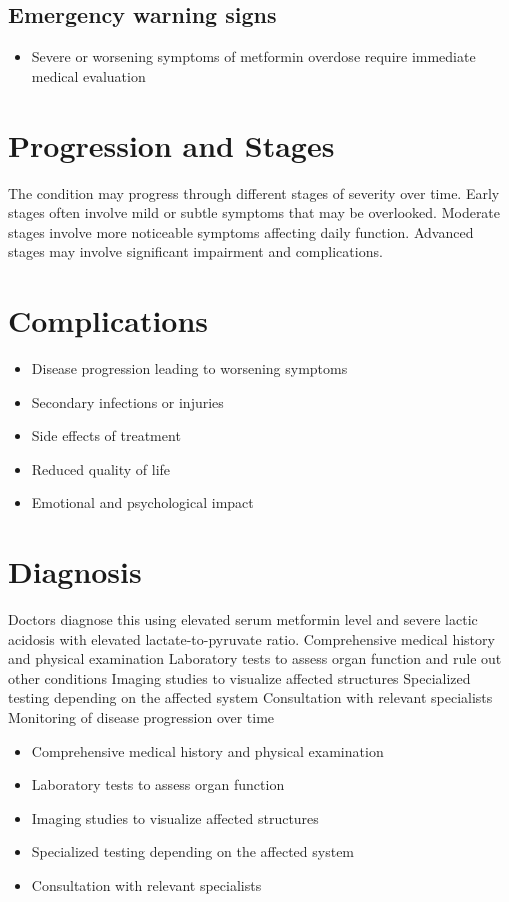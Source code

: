 \subsection{Emergency warning signs}
\begin{itemize}[noitemsep]
  \item Severe or worsening symptoms of metformin overdose require immediate medical evaluation
\end{itemize}
\section{Progression and Stages}
The condition may progress through different stages of severity over time. Early stages often involve mild or subtle symptoms that may be overlooked. Moderate stages involve more noticeable symptoms affecting daily function. Advanced stages may involve significant impairment and complications.
\section{Complications}
\begin{itemize}[noitemsep]
  \item Disease progression leading to worsening symptoms
  \item Secondary infections or injuries
  \item Side effects of treatment
  \item Reduced quality of life
  \item Emotional and psychological impact
\end{itemize}
\section{Diagnosis}
Doctors diagnose this using elevated serum metformin level and severe lactic acidosis with elevated lactate-to-pyruvate ratio. Comprehensive medical history and physical examination Laboratory tests to assess organ function and rule out other conditions Imaging studies to visualize affected structures Specialized testing depending on the affected system Consultation with relevant specialists Monitoring of disease progression over time

\begin{itemize}[noitemsep]
  \item Comprehensive medical history and physical examination
  \item Laboratory tests to assess organ function
  \item Imaging studies to visualize affected structures
  \item Specialized testing depending on the affected system
  \item Consultation with relevant specialists
\end{itemize}
